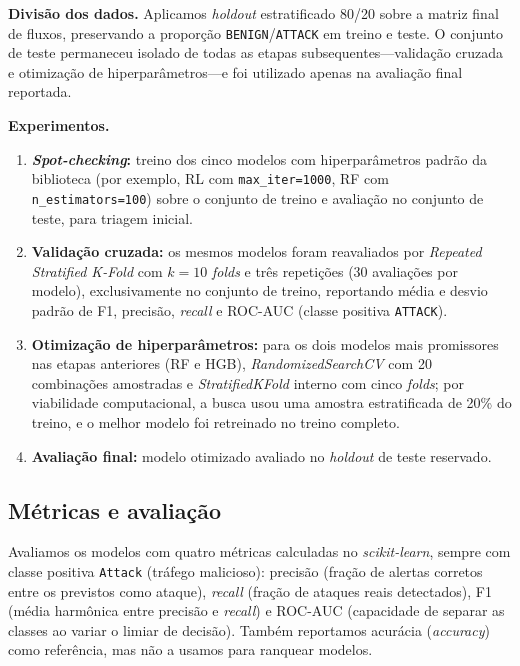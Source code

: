 \documentclass[12pt]{article}
\makeatletter
\newlength{\sbcblockmargin}
\newenvironment{sbcnarrowblock}{%
  \list{}{%
    \topsep\z@
    \partopsep\z@
    \itemsep\z@
    \parsep\z@
    \leftmargin=\sbcblockmargin
    \rightmargin=\sbcblockmargin
    \listparindent=\parindent
    \itemindent=\z@
    \labelwidth=\z@
    \labelsep=\z@
  }\item\relax}
{\endlist}
\makeatother
\begin{document}
\begin{sbcnarrowblock}
\textbf{Divisão dos dados.}
Aplicamos \textit{holdout} estratificado 80/20 sobre a matriz final de fluxos, preservando a proporção \texttt{BENIGN}/\texttt{ATTACK} em treino e teste.
O conjunto de teste permaneceu isolado de todas as etapas subsequentes---validação cruzada e otimização de hiperparâmetros---e foi utilizado apenas na avaliação final reportada.

\textbf{Experimentos.}
\begin{enumerate}
  \item \textbf{\textit{Spot-checking}:} treino dos cinco modelos com hiperparâmetros padrão da biblioteca (por exemplo, RL com \texttt{max\_iter=1000}, RF com \texttt{n\_estimators=100}) sobre o conjunto de treino e avaliação no conjunto de teste, para triagem inicial.
  \item \textbf{Validação cruzada:} os mesmos modelos foram reavaliados por \textit{Repeated Stratified K-Fold} com $k=10$ \textit{folds} e três repetições (30 avaliações por modelo), exclusivamente no conjunto de treino, reportando média e desvio padrão de F1, precisão, \textit{recall} e ROC-AUC (classe positiva \texttt{ATTACK}).
  \item \textbf{Otimização de hiperparâmetros:} para os dois modelos mais promissores nas etapas anteriores (RF e HGB), \textit{RandomizedSearchCV} com 20 combinações amostradas e \textit{StratifiedKFold} interno com cinco \textit{folds}; por viabilidade computacional, a busca usou uma amostra estratificada de 20\% do treino, e o melhor modelo foi retreinado no treino completo.
  \item \textbf{Avaliação final:} modelo otimizado avaliado no \textit{holdout} de teste reservado.
\end{enumerate}

\subsection{Métricas e avaliação}
\label{sec:metrics}

Avaliamos os modelos com quatro métricas calculadas no \textit{scikit-learn}, sempre com classe positiva \texttt{Attack} (tráfego malicioso): precisão (fração de alertas corretos entre os previstos como ataque), \textit{recall} (fração de ataques reais detectados), F1 (média harmônica entre precisão e \textit{recall}) e ROC-AUC (capacidade de separar as classes ao variar o limiar de decisão).
Também reportamos acurácia (\textit{accuracy}) como referência, mas não a usamos para ranquear modelos.


\end{sbcnarrowblock}
\end{document}
